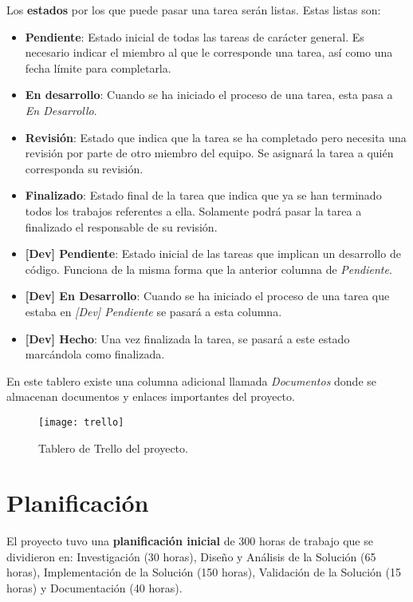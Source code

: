 \documentclass[../main.tex]{subfiles}
\begin{document}
Los \textbf{estados} por los que puede pasar una tarea serán listas. Estas listas son:
\begin{itemize}
    \item\textbf{ Pendiente}: Estado inicial de todas las tareas de carácter general. Es necesario indicar el miembro al que le corresponde una tarea, así como una fecha límite para completarla.
    \item \textbf{En desarrollo}: Cuando se ha iniciado el proceso de una tarea, esta pasa a \textit{En Desarrollo}.
    \item \textbf{Revisión}: Estado que indica que la tarea se ha completado pero necesita una revisión por parte de otro miembro del equipo. Se asignará la tarea a quién corresponda su revisión.
    \item \textbf{Finalizado}: Estado final de la tarea que indica que ya se han terminado todos los trabajos referentes a ella. Solamente podrá pasar la tarea a finalizado el responsable de su revisión.
    \item \textbf{[Dev] Pendiente}: Estado inicial de las tareas que implican un desarrollo de código. Funciona de la misma forma que la anterior columna de \textit{Pendiente}.
    \item \textbf{[Dev] En Desarrollo}: Cuando se ha iniciado el proceso de una tarea que estaba en \textit{[Dev] Pendiente} se pasará a esta columna.
    \item \textbf{[Dev] Hecho}: Una vez finalizada la tarea, se pasará a este estado marcándola como finalizada.
\end{itemize}

En este tablero existe una columna adicional llamada \textit{Documentos} donde se almacenan documentos y enlaces importantes del proyecto.

\begin{figure}[H]
    \centering
    \texttt{[image: trello]}
    \caption{Tablero de Trello del proyecto.}
    \label{img:trello}
\end{figure}

\section{Planificación}
El proyecto tuvo una \textbf{planificación inicial} de 300 horas de trabajo que se dividieron en: Investigación (30 horas), Diseño y Análisis de la Solución (65 horas), Implementación de la Solución (150 horas), Validación de la Solución (15 horas) y Documentación (40 horas).
\end{document}
